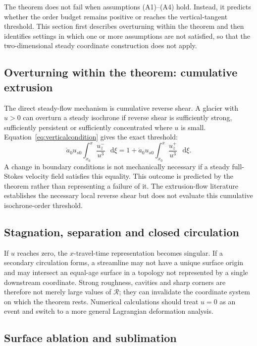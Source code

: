 \documentclass[review]{igs}
\theoremstyle{definition}
\theoremstyle{remark}
\newcommand{\dd}{\mathop{}\!\mathrm{d}}
\newcommand{\Rneg}{\mathcal{R}}
\begin{document}
The theorem does not fail when assumptions (A1)--(A4) hold. Instead, it predicts whether the order budget remains positive or reaches the vertical-tangent threshold. This section first describes overturning within the theorem and then identifies settings in which one or more assumptions are not satisfied, so that the two-dimensional steady coordinate construction does not apply.

\subsection{Overturning within the theorem: cumulative extrusion}

The direct steady-flow mechanism is cumulative reverse shear. A glacier with \(u>0\) can overturn a steady isochrone if reverse shear is sufficiently strong, sufficiently persistent or sufficiently concentrated where \(u\) is small. Equation~\eqref{eq:verticalcondition} gives the exact threshold:
\begin{equation}
\dot a_0u_{s0}
\int_{x_0}^{x}\frac{u_z^-}{u^3}\,\dd\xi
=
1+
\dot a_0u_{s0}
\int_{x_0}^{x}\frac{u_z^+}{u^3}\,\dd\xi.
\label{eq:exactthresholdexpanded}
\end{equation}
A change in boundary conditions is not mechanically necessary if a steady full-Stokes velocity field satisfies this equality. This outcome is predicted by the theorem rather than representing a failure of it. The extrusion-flow literature establishes the necessary local reverse shear but does not evaluate this cumulative isochrone-order threshold.

\subsection{Stagnation, separation and closed circulation}

If \(u\) reaches zero, the \(x\)-travel-time representation becomes singular. If a secondary circulation forms, a streamline may not have a unique surface origin and may intersect an equal-age surface in a topology not represented by a single downstream coordinate. Strong roughness, cavities and sharp corners are therefore not merely large values of \(\Rneg\); they can invalidate the coordinate system on which the theorem rests. Numerical calculations should treat \(u=0\) as an event and switch to a more general Lagrangian deformation analysis.

\subsection{Surface ablation and sublimation}
\end{document}
